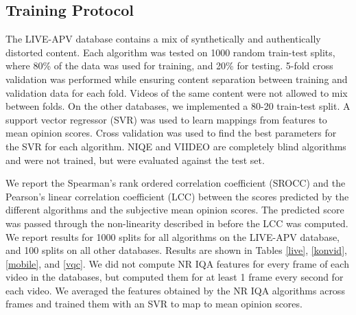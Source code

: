 \documentclass[conference]{IEEEtran}
\begin{document}
\subsection{Training Protocol}
The LIVE-APV database contains a mix of synthetically and authentically distorted content. Each algorithm was tested on 1000 random train-test splits, where 80\% of the data was used for training, and 20\% for testing. 5-fold cross validation was performed while ensuring content separation between training and validation data for each fold. Videos of the same content were not allowed to mix between folds. On the other databases, we implemented a 80-20 train-test split. A support vector regressor (SVR) was used to learn mappings from features to mean opinion scores. Cross validation was used to find the best parameters for the SVR for each algorithm. NIQE and VIIDEO are completely blind algorithms and were not trained, but were evaluated against the test set. 

We report the Spearman's rank ordered correlation coefficient (SROCC) and the Pearson’s linear correlation coefficient (LCC) between the scores predicted by the different algorithms and the subjective mean opinion scores. The predicted score was passed through the non-linearity described in\cite{logistic} before the LCC was computed. We report results for 1000 splits for all algorithms on the LIVE-APV database, and 100 splits on all other databases. Results are shown in Tables \ref{live}, \ref{konvid}, \ref{mobile}, and \ref{vqc}. We did not compute NR IQA features for every frame of each video in the databases, but computed them for at least 1 frame every second for each video. We averaged the features obtained by the NR IQA algorithms across frames and trained them with an SVR to map to mean opinion scores.
\end{document}
